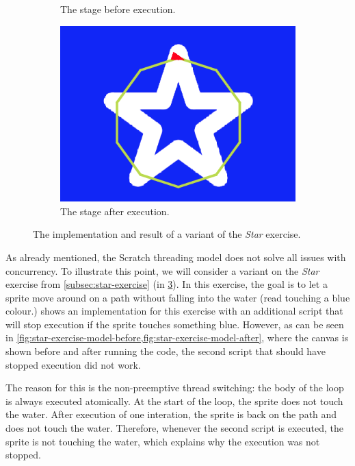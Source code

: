 \documentclass[../main]{subfiles}
\begin{document}
\begin{figure}
\begin{subfigure}{0.45\textwidth}
        \caption{The stage before execution.}
        \label{fig:star-exercise-model-before}
    \end{subfigure}
    \hfill
    \begin{subfigure}{0.45\textwidth}
        \includegraphics[width=\textwidth]{star-after}
        \caption{The stage after execution.}
        \label{fig:star-exercise-model-after}
    \end{subfigure}
    \caption{The implementation and result of a variant of the \emph{Star} exercise.}
    \label{fig:star-exercise-model}
\end{figure}

As \citeauthor{maloneyScratchProgrammingLanguage2010a} already mentioned, the Scratch threading model does not solve all issues with concurrency.
To illustrate this point, we will consider a variant on the \emph{Star} exercise from \cref{subsec:star-exercise} (in \cref{fig:star-exercise-model}).
In this exercise, the goal is to let a sprite move around on a path without falling into the water (read touching a blue colour.)
 shows an implementation for this exercise with an additional script that will stop execution if the sprite touches something blue.
However, as can be seen in \cref{fig:star-exercise-model-before,fig:star-exercise-model-after}, where the canvas is shown before and after running the code, the second script that should have stopped execution did not work.

The reason for this is the non-preemptive thread switching: the body of the loop is always executed atomically.
At the start of the loop, the sprite does not touch the water.
After execution of one interation, the sprite is back on the path and does not touch the water.
Therefore, whenever the second script is executed, the sprite is not touching the water, which explains why the execution was not stopped.
\end{document}
